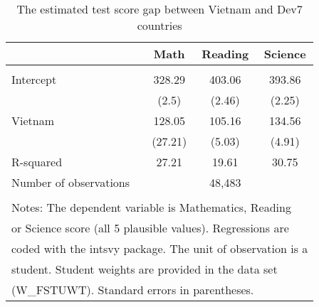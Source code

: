 \documentclass[10pt]{article}
\begin{document}
\begin{table}[htbp]
\footnotesize
	\def\arraystretch{0.9}
  \centering
  \caption{The estimated test score gap between Vietnam and Dev7 countries}
    \begin{tabular}{lccc}
     \toprule
     \midrule
     & \multicolumn{1}{c}{Math} & \multicolumn{1}{c}{Reading} & \multicolumn{1}{c}{Science} \\
     \hline \\
     Intercept & 328.29 & 403.06 & 393.86 \\
     & (2.5) & (2.46) & (2.25) \\
     Vietnam & 128.05 & 105.16 & 134.56 \\
     & (27.21) & (5.03) & (4.91) \\ 
     R-squared & 27.21 & 19.61 & 30.75 \\
     Number of observations &  & 48,483 &\\
     \hline \\
     \multicolumn{4}{l}{Notes: The dependent variable is Mathematics, Reading} \\
     \multicolumn{4}{l}{or Science score (all 5 plausible values). Regressions are} \\
     \multicolumn{4}{l}{coded with the intsvy package. The unit of observation is a} \\
     \multicolumn{4}{l}{student. Student weights are provided in the data set} \\
     \multicolumn{4}{l}{(W\_FSTUWT). Standard errors in parentheses.} \\
      
        \end{tabular}%
        \label{tab:addlabel}%
    \end{table}%
    
\end{document}
